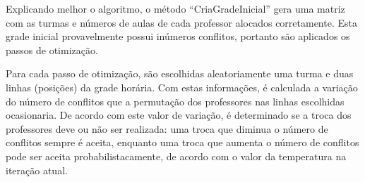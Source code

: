 Explicando melhor o algoritmo, o método ``CriaGradeInicial''  gera uma matriz com as turmas e números de aulas de cada professor alocados corretamente. Esta grade inicial provavelmente possui inúmeros conflitos, portanto são aplicados os passos de otimização. 

Para cada passo de otimização, são escolhidas aleatoriamente uma turma e duas linhas (posições) da grade horária. Com estas informações, é calculada a variação do número de conflitos que a permutação dos professores nas linhas escolhidas ocasionaria. De acordo com este valor de variação, é determinado se a troca dos professores deve ou não ser realizada: uma troca que diminua o número de conflitos sempre é aceita, enquanto uma troca que aumenta o número de conflitos pode ser aceita probabilistacamente, de acordo com o valor da temperatura na iteração atual.


